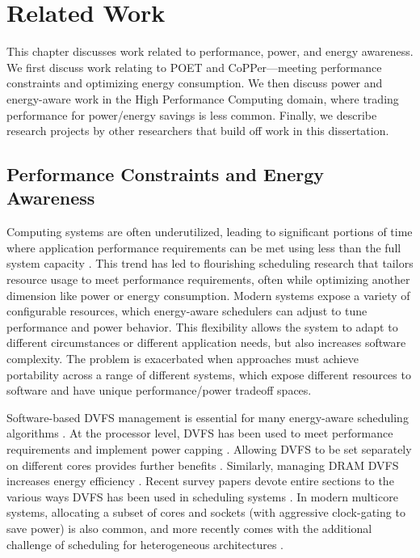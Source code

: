 \chapter{Related Work}
\label{sec:related}

This chapter discusses work related to performance, power, and energy awareness.
We first discuss work relating to POET and CoPPer---meeting performance constraints and optimizing energy consumption.
We then discuss power and energy-aware work in the High Performance Computing domain, where trading performance for power/energy savings is less common.
Finally, we describe research projects by other researchers that build off work in this dissertation.


\section{Performance Constraints and Energy Awareness}

Computing systems are often underutilized, leading to significant portions of time where application performance requirements can be met using less than the full system capacity \cite{google,MeisnerISCA2011}.
This trend has led to flourishing scheduling research that tailors resource usage to meet performance requirements, often while optimizing another dimension like power or energy consumption.
Modern systems expose a variety of configurable resources, which energy-aware schedulers can adjust to tune performance and power behavior.
This flexibility allows the system to adapt to different circumstances or different application needs, but also increases software complexity.
The problem is exacerbated when approaches must achieve portability across a range of different systems, which expose different resources to software and have unique performance/power tradeoff spaces.

Software-based DVFS management is essential for many energy-aware scheduling algorithms \cite{Albers,YDS}.
At the processor level, DVFS has been used to meet performance requirements \cite{Lu2002,Wu2004} and implement power capping \cite{lefurgy2008power}.
Allowing DVFS to be set separately on different cores provides further benefits \cite{Isci2006,Rangan2009}.
Similarly, managing DRAM DVFS increases energy efficiency \cite{Memscale,Diniz2007}.
Recent survey papers devote entire sections to the various ways DVFS has been used in scheduling systems \cite{MittalSurvey,ZhuralevSurvey}.
In modern multicore systems, allocating a subset of cores and sockets (with aggressive clock-gating to save power) is also common, and more recently comes with the additional challenge of scheduling for heterogeneous architectures \cite{Petrucci2012}.

